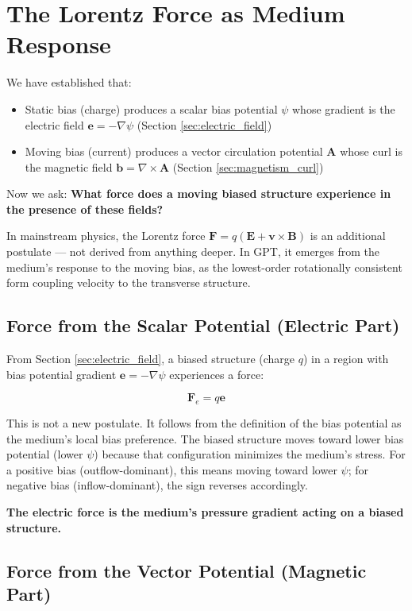 \documentclass[12pt, a4paper]{article}
\begin{document}
\section{The Lorentz Force as Medium Response}
\label{sec:lorentz_force}

We have established that:
\begin{itemize}
    \item Static bias (charge) produces a scalar bias potential \( \psi \) whose gradient is the electric field \( \mathbf{e} = -\nabla \psi \) (Section \ref{sec:electric_field})
    \item Moving bias (current) produces a vector circulation potential \( \mathbf{A} \) whose curl is the magnetic field \( \mathbf{b} = \nabla \times \mathbf{A} \) (Section \ref{sec:magnetism_curl})
\end{itemize}

Now we ask: \textbf{What force does a moving biased structure experience in the presence of these fields?}

In mainstream physics, the Lorentz force \( \mathbf{F} = q(\mathbf{E} + \mathbf{v} \times \mathbf{B}) \) is an additional postulate — not derived from anything deeper. In GPT, it emerges from the medium's response to the moving bias, as the lowest-order rotationally consistent form coupling velocity to the transverse structure.

\subsection{Force from the Scalar Potential (Electric Part)}
\label{subsec:electric_force}

From Section \ref{sec:electric_field}, a biased structure (charge \( q \)) in a region with bias potential gradient \( \mathbf{e} = -\nabla \psi \) experiences a force:

\[
\mathbf{F}_e = q \mathbf{e}
\]

This is not a new postulate. It follows from the definition of the bias potential as the medium's local bias preference. The biased structure moves toward lower bias potential (lower \( \psi \)) because that configuration minimizes the medium's stress. For a positive bias (outflow-dominant), this means moving toward lower \( \psi \); for negative bias (inflow-dominant), the sign reverses accordingly.

\textbf{The electric force is the medium's pressure gradient acting on a biased structure.}

\subsection{Force from the Vector Potential (Magnetic Part)}
\label{subsec:magnetic_force}
\end{document}
